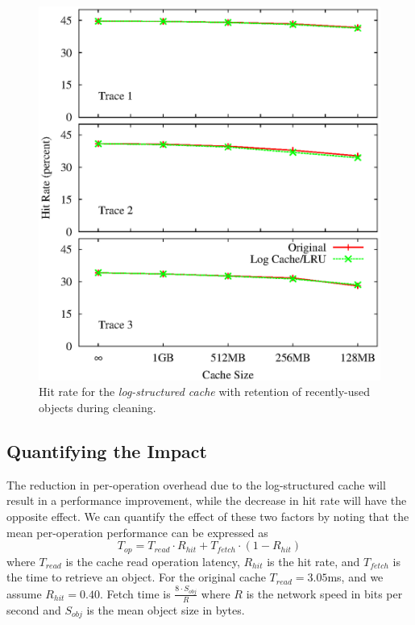 \documentclass[letterpaper,twocolumn,10pt]{article}
\begin{document}
\begin{figure}
\centering
\includegraphics[width=1.05\columnwidth]{graphs/hit-rate-3}
\caption{Hit rate for the \emph{log-structured cache} with retention
  of recently-used objects during cleaning.}
\label{fig:hit-rate2}
\end{figure}

\subsection{Quantifying the Impact}
The reduction in per-operation overhead due to the log-structured cache will
result in a  performance improvement, while the decrease in hit rate will have
the opposite effect. We can quantify the effect of these two factors by noting
that the mean per-operation performance can be expressed as
\begin{equation}
T_{op} = T_{read}\cdot R_{hit} + T_{fetch}\cdot (1-R_{hit})
\end{equation}
where $T_{read}$ is the cache read operation latency, $R_{hit}$ is the hit rate,
and $T_{fetch}$ is the time to retrieve an object. For the original cache 
$T_{read}=3.05$ms, and we assume $R_{hit}=0.40$. Fetch time is $\frac{8\cdot S_{obj}}{R}$
where $R$ is the network speed in bits per second and $S_{obj}$ is the mean
object size in bytes.
\end{document}
